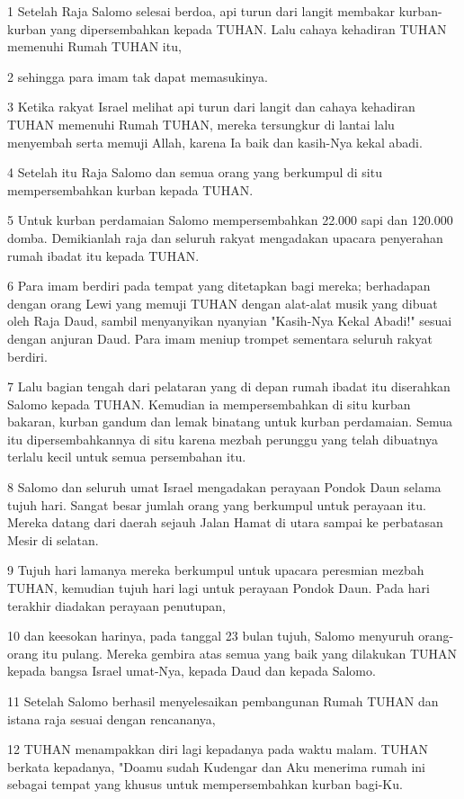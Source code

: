 \par 1 Setelah Raja Salomo selesai berdoa, api turun dari langit membakar kurban-kurban yang dipersembahkan kepada TUHAN. Lalu cahaya kehadiran TUHAN memenuhi Rumah TUHAN itu,
\par 2 sehingga para imam tak dapat memasukinya.
\par 3 Ketika rakyat Israel melihat api turun dari langit dan cahaya kehadiran TUHAN memenuhi Rumah TUHAN, mereka tersungkur di lantai lalu menyembah serta memuji Allah, karena Ia baik dan kasih-Nya kekal abadi.
\par 4 Setelah itu Raja Salomo dan semua orang yang berkumpul di situ mempersembahkan kurban kepada TUHAN.
\par 5 Untuk kurban perdamaian Salomo mempersembahkan 22.000 sapi dan 120.000 domba. Demikianlah raja dan seluruh rakyat mengadakan upacara penyerahan rumah ibadat itu kepada TUHAN.
\par 6 Para imam berdiri pada tempat yang ditetapkan bagi mereka; berhadapan dengan orang Lewi yang memuji TUHAN dengan alat-alat musik yang dibuat oleh Raja Daud, sambil menyanyikan nyanyian "Kasih-Nya Kekal Abadi!" sesuai dengan anjuran Daud. Para imam meniup trompet sementara seluruh rakyat berdiri.
\par 7 Lalu bagian tengah dari pelataran yang di depan rumah ibadat itu diserahkan Salomo kepada TUHAN. Kemudian ia mempersembahkan di situ kurban bakaran, kurban gandum dan lemak binatang untuk kurban perdamaian. Semua itu dipersembahkannya di situ karena mezbah perunggu yang telah dibuatnya terlalu kecil untuk semua persembahan itu.
\par 8 Salomo dan seluruh umat Israel mengadakan perayaan Pondok Daun selama tujuh hari. Sangat besar jumlah orang yang berkumpul untuk perayaan itu. Mereka datang dari daerah sejauh Jalan Hamat di utara sampai ke perbatasan Mesir di selatan.
\par 9 Tujuh hari lamanya mereka berkumpul untuk upacara peresmian mezbah TUHAN, kemudian tujuh hari lagi untuk perayaan Pondok Daun. Pada hari terakhir diadakan perayaan penutupan,
\par 10 dan keesokan harinya, pada tanggal 23 bulan tujuh, Salomo menyuruh orang-orang itu pulang. Mereka gembira atas semua yang baik yang dilakukan TUHAN kepada bangsa Israel umat-Nya, kepada Daud dan kepada Salomo.
\par 11 Setelah Salomo berhasil menyelesaikan pembangunan Rumah TUHAN dan istana raja sesuai dengan rencananya,
\par 12 TUHAN menampakkan diri lagi kepadanya pada waktu malam. TUHAN berkata kepadanya, "Doamu sudah Kudengar dan Aku menerima rumah ini sebagai tempat yang khusus untuk mempersembahkan kurban bagi-Ku.
